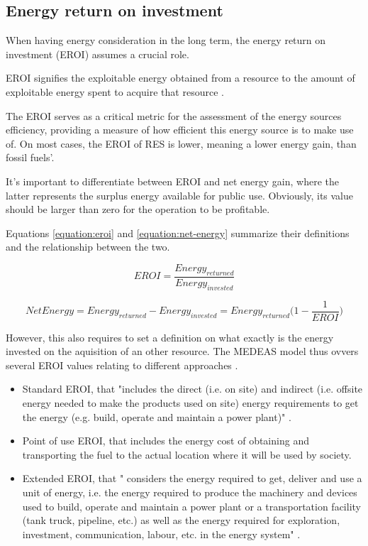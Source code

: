 \subsection{Energy return on investment}

When having energy consideration in the long term, the energy return on investment (EROI) assumes a crucial role.

EROI signifies the exploitable energy obtained from a resource to the amount of exploitable energy spent to acquire that resource \cite{wiki-eroi}.

The EROI serves as a critical metric for the assessment of the energy sources efficiency, providing a measure of how efficient this energy source is to make use of. On most cases, the EROI of RES is lower, meaning a lower energy gain, than fossil fuels'.

It's important to differentiate between EROI and net energy gain, where the latter represents the surplus energy available for public use. Obviously, its value should be larger than zero for the operation to be profitable.

Equations \ref{equation:eroi} and \ref{equation:net-energy} summarize their definitions and the relationship between the two.

\begin{equation}
    EROI=\frac{Energy_{returned}}{Energy_{invested}}
    \label{equation:eroi}
\end{equation}

\begin{equation}
    NetEnergy = Energy_{returned} - Energy_{invested} = Energy_{returned} \Big( 1 - \frac{1}{EROI}\Big)
    \label{equation:net-energy}
\end{equation}

However, this also requires to set a definition on what exactly is the energy invested on the aquisition of an other resource. The MEDEAS model thus ovvers several EROI values relating to different approaches \cite{medeas-cost-of-transition}.
\begin{itemize}
    \item Standard EROI, that "includes the direct (i.e. on site) and indirect (i.e. offsite energy needed to make the products used on site) energy requirements to get the energy (e.g. build, operate and maintain a power plant)" \cite{medeas-cost-of-transition}.
    \item Point of use EROI, that includes the energy cost of obtaining and transporting the fuel to the actual location where it will be used by society.
    \item Extended EROI, that " considers the energy required to get, deliver and use a unit of energy, i.e. the energy required to produce the machinery and devices used to build, operate and maintain a power plant or a transportation facility (tank truck, pipeline, etc.) as well as the energy required for exploration, investment, communication, labour, etc. in the energy system" \cite{medeas-cost-of-transition}.
\end{itemize}

